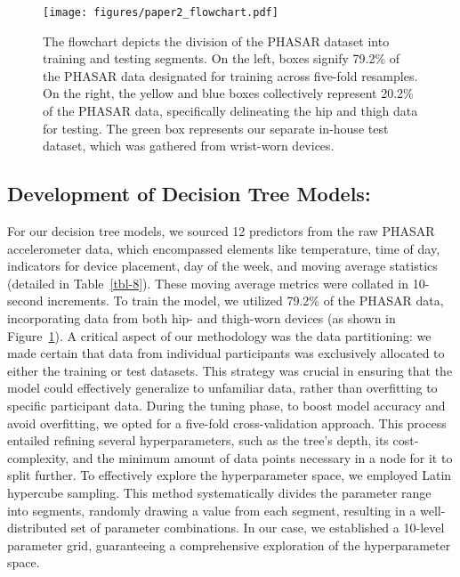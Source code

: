 \documentclass[
  9pt,
]{scrbook}
\begin{document}
\begin{figure}

{\centering \texttt{[image: figures/paper2\_flowchart.pdf]}

}

\caption{\label{fig-paper2_flowchart}The flowchart depicts the division
of the PHASAR dataset into training and testing segments. On the left,
boxes signify 79.2\% of the PHASAR data designated for training across
five-fold resamples. On the right, the yellow and blue boxes
collectively represent 20.2\% of the PHASAR data, specifically
delineating the hip and thigh data for testing. The green box represents
our separate in-house test dataset, which was gathered from wrist-worn
devices.}

\end{figure}

\hypertarget{development-of-decision-tree-models}{%
\subsection{Development of Decision Tree
Models:}\label{development-of-decision-tree-models}}

For our decision tree models, we sourced 12 predictors from the raw
PHASAR accelerometer data, which encompassed elements like temperature,
time of day, indicators for device placement, day of the week, and
moving average statistics (detailed in Table~\ref{tbl-8}). These moving
average metrics were collated in 10-second increments. To train the
model, we utilized 79.2\% of the PHASAR data, incorporating data from
both hip- and thigh-worn devices (as shown in
Figure~\ref{fig-paper2_flowchart}). A critical aspect of our methodology
was the data partitioning: we made certain that data from individual
participants was exclusively allocated to either the training or test
datasets. This strategy was crucial in ensuring that the model could
effectively generalize to unfamiliar data, rather than overfitting to
specific participant data. During the tuning phase, to boost model
accuracy and avoid overfitting, we opted for a five-fold
cross-validation approach. This process entailed refining several
hyperparameters, such as the tree's depth, its cost-complexity, and the
minimum amount of data points necessary in a node for it to split
further. To effectively explore the hyperparameter space, we employed
Latin hypercube sampling. This method systematically divides the
parameter range into segments, randomly drawing a value from each
segment, resulting in a well-distributed set of parameter combinations.
In our case, we established a 10-level parameter grid, guaranteeing a
comprehensive exploration of the hyperparameter space.
\end{document}
